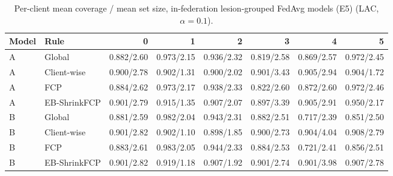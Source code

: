 \documentclass[10pt]{article}
\begin{document}
\begin{table}[!htbp]
\centering
\scriptsize
\caption{Per-client mean coverage / mean set size, in-federation lesion-grouped FedAvg models (E5) (LAC, $\alpha=0.1$).}
\label{tab:s5pcE5}
\begin{tabular}{@{}llrrrrrr@{}}
\toprule
Model & Rule & 0 & 1 & 2 & 3 & 4 & 5 \\
\midrule
A & Global & 0.882/2.60 & 0.973/2.15 & 0.936/2.32 & 0.819/2.58 & 0.869/2.57 & 0.972/2.45 \\
A & Client-wise & 0.900/2.78 & 0.902/1.31 & 0.900/2.02 & 0.901/3.43 & 0.905/2.94 & 0.904/1.72 \\
A & FCP & 0.884/2.62 & 0.973/2.17 & 0.938/2.33 & 0.822/2.60 & 0.872/2.60 & 0.972/2.46 \\
A & EB-ShrinkFCP & 0.901/2.79 & 0.915/1.35 & 0.907/2.07 & 0.897/3.39 & 0.905/2.91 & 0.950/2.17 \\
B & Global & 0.881/2.59 & 0.982/2.04 & 0.943/2.31 & 0.882/2.51 & 0.717/2.39 & 0.851/2.50 \\
B & Client-wise & 0.901/2.82 & 0.902/1.10 & 0.898/1.85 & 0.900/2.73 & 0.904/4.04 & 0.908/2.79 \\
B & FCP & 0.883/2.61 & 0.983/2.05 & 0.944/2.33 & 0.884/2.53 & 0.721/2.41 & 0.856/2.51 \\
B & EB-ShrinkFCP & 0.901/2.82 & 0.919/1.18 & 0.907/1.92 & 0.901/2.74 & 0.901/3.98 & 0.907/2.78 \\
\bottomrule
\end{tabular}
\end{table}
\end{document}
